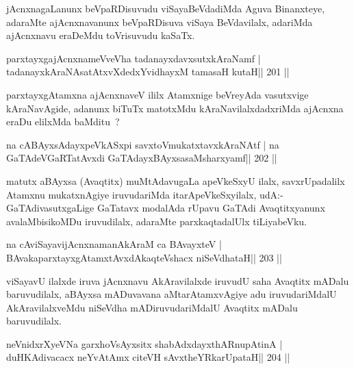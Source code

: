 \begin{artha}
jAcnxnagaLanunx beVpaRDisuvudu viSayaBeVdadiMda Aguva Binanxteye, adaraMte ajAcnxnavanunx beVpaRDisuva viSaya BeVdavilalx, adariMda ajAcnxnavu eraDeMdu toVrisuvudu kaSaTx.
\end{artha}


\begin{shl}
parxtayxgajAcnxnameVveVha tadanayxdavxsutxkAraNamf |
tadanayxkAraNAsatAtxvXdedxYvidhayxM tamasaH kutaH\hfill || 201 ||
\end{shl}

\begin{artha}
parxtayxgAtamxna ajAcnxnaveV ililx Atamxnige beVreyAda vasutxvige kAraNavAgide, adanunx biTuTx matotxMdu kAraNavilalxdadxriMda ajAcnxna eraDu elilxMda baMditu~?
\end{artha}

\begin{shl}
na cABAyxsAdayxpeVkASx\s pi savxtoVmukatxtavxkAraNAtf |
na GaTAdeVGaRTatAvxdi GaTAdayxBAyxsasaMsharxyamf\hfill || 202 ||
\end{shl}

\begin{artha}
matutx aBAyxsa (Avaqtitx) muMtAdavugaLa apeVkeSxyU ilalx, savxrUpadalilx Atamxnu mukatxnAgiye iruvudariMda itarApeVkeSxyilalx, udA:- GaTAdivasutxgaLige GaTatavx modalAda rUpavu GaTAdi Avaqtitxyanunx avalaMbisikoMDu iruvudilalx, adaraMte parxkaqtadalUlx tiLiyabeVku.
\end{artha}

\begin{shl}
na cAviSayavijAcnxnamanAkAraM ca BAvayxteV |
BAvakaparxtayxgAtamxtAvxdAkaqteVshacx niSeVdhataH\hfill || 203 ||
\end{shl}

\begin{artha}
viSayavU ilalxde iruva jAcnxnavu AkAravilalxde iruvudU saha Avaqtitx mADalu baruvudilalx, aBAyxsa mADuvavana aMtarAtamxvAgiye adu iruvudariMdalU AkAravilalxveMdu niSeVdha mADiruvudariMdalU Avaqtitx mADalu baruvudilalx.
\end{artha}


\begin{shl}
neVnidxrXyeVNa garxhoV\s sAyxsitx shabAdxdayxthARnupAtinA |
duHKAdivacacx neYvA\s\s tAmx citeVH sAvxtheYRkarUpataH\hfill || 204 ||
\end{shl}

